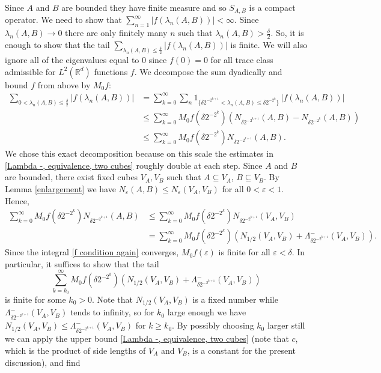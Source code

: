 \documentclass[12pt]{amsart}
\numberwithin{equation}{section}
\newcommand{\R}{\mathbb{R}}
\newcommand{\eps}{\varepsilon}
\begin{document}
Since $A$ and $B$ are bounded they have finite measure and so $S_{A,B}$ is a compact operator. We need to show that $\sum_{n=1}^\infty |f(\lambda_n(A,B))| < \infty$. Since $\lambda_n(A,B)\to 0$ there are only finitely many $n$ such that $\lambda_n(A,B) > \frac{\delta}{2}$. So, it is enough to show that the tail $\sum_{\lambda_n(A,B)\leq \frac{\delta}{2}}|f(\lambda_n(A,B))|$ is finite. We will also ignore all of the eigenvalues equal to $0$ since $f(0) = 0$ for all trace class admissible for $L^2(\R^d)$ functions $f$.
We decompose the sum dyadically and bound $f$ from above by $M_0f$:
\begin{align*}
\sum_{0<\lambda_n(A,B)\leq \frac{\delta}{2}}|f(\lambda_n(A,B))| &= \sum_{k=0}^\infty \sum_n 1_{\{\delta 2^{-2^{k+1}}<\lambda_n(A,B) \le \delta 2^{-2^k} \}} \, |f(\lambda_n(A,B))|\\
& \leq \sum_{k=0}^\infty M_0 f\left(\delta 2^{-2^k}\right)\left(N_{\delta 2^{-2^{k+1}}}(A,B) - N_{\delta 2^{-2^k}}(A,B)\right)\\
&\le \sum_{k=0}^\infty M_0 f\left(\delta 2^{-2^k}\right)N_{\delta 2^{-2^{k+1}}}(A,B).
\end{align*}
We chose this exact decomposition because on this scale the estimates in \eqref{Lambda -, equivalence, two cubes} roughly double at each step. 
Since $A$ and $B$ are bounded, there exist fixed cubes $V_A, V_B$ such that $A\subseteq V_A$, $B\subseteq V_B$. By Lemma \ref{enlargement} we have $N_\eps(A,B)\le N_\eps(V_A,V_B)$ for all $0 < \eps < 1$. Hence,
\begin{align*}
\sum_{k=0}^\infty M_0 f\left(\delta 2^{-2^k}\right)N_{\delta 2^{-2^{k+1}}}(A,B)&\leq \sum_{k=0}^\infty M_0 f\left(\delta 2^{-2^k}\right)N_{\delta 2^{-2^{k+1}}}(V_A,V_B)\\
&= \sum_{k=0}^\infty M_0 f\left(\delta 2^{-2^k}\right)(N_{1/2}(V_A,V_B)+\Lambda^-_{\delta 2^{-2^{k+1}}}(V_A,V_B)).
\end{align*}
Since the integral \eqref{f condition again} converges, $M_0  f(\eps)$ is finite for all $\eps < \delta$. In particular, it suffices to show that the tail
\[
\sum_{k=k_0}^\infty M_0 f\left(\delta 2^{-2^k}\right)(N_{1/2}(V_A,V_B)+\Lambda^-_{\delta 2^{-2^{k+1}}}(V_A,V_B))
\]
is finite for some $k_0 >0$. Note that $N_{1/2}(V_A,V_B)$ is a fixed number while $\Lambda^-_{\delta 2^{-2^{k+1}}}(V_A,V_B)$ tends to infinity, so for $k_0$ large enough we have $N_{1/2}(V_A,V_B) \leq \Lambda^-_{\delta 2^{-2^{k+1}}}(V_A,V_B)$ for $k\geq k_0$. By possibly choosing $k_0$ larger still we can apply the upper bound \eqref{Lambda -, equivalence, two cubes} (note that $c$, which is the product of side lengths of $V_A$ and $V_B$, is a constant for the present discussion), and find
\end{document}
